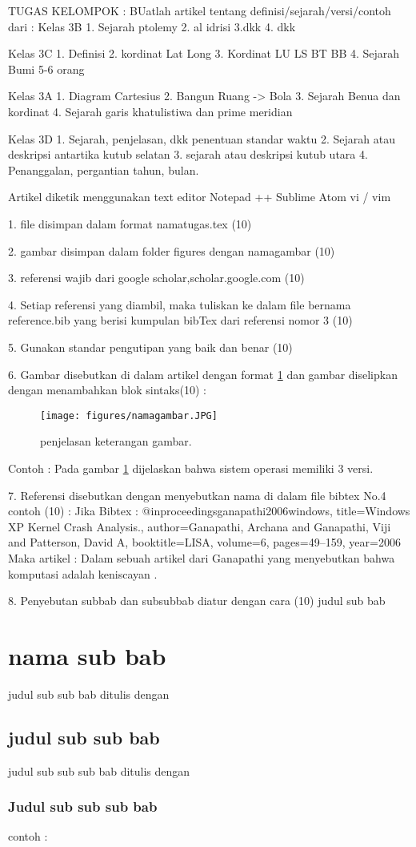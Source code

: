 TUGAS KELOMPOK : 
BUatlah artikel tentang definisi/sejarah/versi/contoh dari :
Kelas 3B
1. Sejarah ptolemy
2. al idrisi
3.dkk
4. dkk

Kelas 3C
1. Definisi
2. kordinat Lat Long
3. Kordinat LU LS BT BB
4. Sejarah Bumi
5-6 orang

Kelas 3A
1. Diagram Cartesius
2. Bangun Ruang -> Bola
3. Sejarah Benua dan kordinat
4. Sejarah garis khatulistiwa dan prime meridian

Kelas 3D
1. Sejarah, penjelasan, dkk penentuan standar waktu
2. Sejarah atau deskripsi antartika kutub selatan
3. sejarah atau deskripsi kutub utara
4. Penanggalan, pergantian tahun, bulan.


Artikel diketik menggunakan text editor
Notepad ++
Sublime
Atom
vi / vim

1. file disimpan dalam format namatugas.tex (10)

2. gambar disimpan dalam folder figures dengan namagambar (10)

3. referensi wajib dari google scholar,scholar.google.com (10)

4. Setiap referensi yang diambil, maka tuliskan ke dalam 
	file bernama reference.bib
   yang berisi kumpulan bibTex dari referensi nomor 3 (10)

5. Gunakan standar pengutipan yang baik dan benar (10)

6. Gambar disebutkan di dalam artikel dengan format \ref{namagambar}
   dan gambar diselipkan dengan menambahkan blok sintaks(10) :
	\begin{figure}[ht]
	\centerline{\texttt{[image: figures/namagambar.JPG]}}
	\caption{penjelasan keterangan gambar.}
	\label{namagambar}
	\end{figure}
	Contoh :
	Pada gambar \ref{namagambar} dijelaskan bahwa sistem operasi memiliki 
	3 versi.
	
7. Referensi disebutkan dengan menyebutkan nama di dalam file bibtex No.4
   contoh (10) :
	Jika Bibtex :
	@inproceedings{ganapathi2006windows,
	  title={Windows XP Kernel Crash Analysis.},
	  author={Ganapathi, Archana and Ganapathi, Viji and Patterson, David A},
	  booktitle={LISA},
	  volume={6},
	  pages={49--159},
	  year={2006}
	}
	Maka artikel :
	Dalam sebuah artikel dari Ganapathi yang menyebutkan bahwa komputasi 
	adalah keniscayan \cite{ganapathi2006windows}.
	
	
8. Penyebutan subbab dan subsubbab diatur dengan cara (10)
	judul sub bab \section{nama sub bab}
	judul sub sub bab ditulis dengan \subsection{judul sub sub bab}
	judul sub sub sub bab ditulis dengan \subsubsection{Judul sub sub sub bab}
	contoh :
